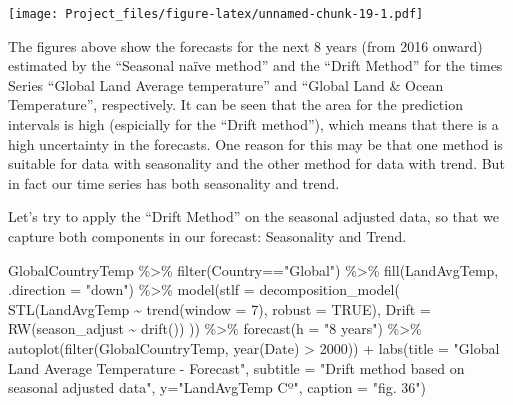\documentclass[
]{article}
\newenvironment{Shaded}{\begin{snugshade}}{\end{snugshade}}
\newcommand{\AttributeTok}[1]{\textcolor[rgb]{0.77,0.63,0.00}{#1}}
\newcommand{\ConstantTok}[1]{\textcolor[rgb]{0.00,0.00,0.00}{#1}}
\newcommand{\DecValTok}[1]{\textcolor[rgb]{0.00,0.00,0.81}{#1}}
\newcommand{\FunctionTok}[1]{\textcolor[rgb]{0.00,0.00,0.00}{#1}}
\newcommand{\NormalTok}[1]{#1}
\newcommand{\SpecialCharTok}[1]{\textcolor[rgb]{0.00,0.00,0.00}{#1}}
\newcommand{\StringTok}[1]{\textcolor[rgb]{0.31,0.60,0.02}{#1}}
\begin{document}
\texttt{[image: Project\_files/figure-latex/unnamed-chunk-19-1.pdf]}

The figures above show the forecasts for the next 8 years (from 2016
onward) estimated by the ``Seasonal naïve method'' and the ``Drift
Method'' for the times Series ``Global Land Average temperature'' and
``Global Land \& Ocean Temperature'', respectively. It can be seen that
the area for the prediction intervals is high (espicially for the
``Drift method''), which means that there is a high uncertainty in the
forecasts. One reason for this may be that one method is suitable for
data with seasonality and the other method for data with trend. But in
fact our time series has both seasonality and trend.

Let's try to apply the ``Drift Method'' on the seasonal adjusted data,
so that we capture both components in our forecast: Seasonality and
Trend.

\begin{Shaded}
\begin{Highlighting}[]
\NormalTok{GlobalCountryTemp }\SpecialCharTok{\%\textgreater{}\%} 
  \FunctionTok{filter}\NormalTok{(Country}\SpecialCharTok{==}\StringTok{"Global"}\NormalTok{) }\SpecialCharTok{\%\textgreater{}\%} 
  \FunctionTok{fill}\NormalTok{(LandAvgTemp, }\AttributeTok{.direction =} \StringTok{"down"}\NormalTok{) }\SpecialCharTok{\%\textgreater{}\%}
  \FunctionTok{model}\NormalTok{(}\AttributeTok{stlf =} \FunctionTok{decomposition\_model}\NormalTok{(}
    \FunctionTok{STL}\NormalTok{(LandAvgTemp }\SpecialCharTok{\textasciitilde{}} \FunctionTok{trend}\NormalTok{(}\AttributeTok{window =} \DecValTok{7}\NormalTok{), }\AttributeTok{robust =} \ConstantTok{TRUE}\NormalTok{),}
        \AttributeTok{Drift =} \FunctionTok{RW}\NormalTok{(season\_adjust }\SpecialCharTok{\textasciitilde{}} \FunctionTok{drift}\NormalTok{())}
\NormalTok{    )) }\SpecialCharTok{\%\textgreater{}\%} 
  \FunctionTok{forecast}\NormalTok{(}\AttributeTok{h =} \StringTok{"8 years"}\NormalTok{) }\SpecialCharTok{\%\textgreater{}\%} 
  \FunctionTok{autoplot}\NormalTok{(}\FunctionTok{filter}\NormalTok{(GlobalCountryTemp, }\FunctionTok{year}\NormalTok{(Date) }\SpecialCharTok{\textgreater{}} \DecValTok{2000}\NormalTok{)) }\SpecialCharTok{+}
  \FunctionTok{labs}\NormalTok{(}\AttributeTok{title =} \StringTok{"Global Land Average Temperature {-} Forecast"}\NormalTok{,}
       \AttributeTok{subtitle =} \StringTok{"Drift method based on seasonal adjusted data"}\NormalTok{,}
       \AttributeTok{y=}\StringTok{"LandAvgTemp Cº"}\NormalTok{,}
       \AttributeTok{caption =} \StringTok{"fig. 36"}\NormalTok{)}
\end{Highlighting}
\end{Shaded}
\end{document}
